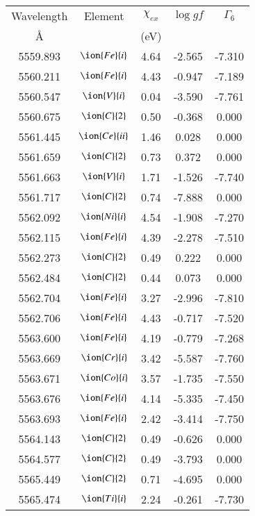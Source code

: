 \documentclass[fleqn,usenatbib]{mnras}
\begin{document}
\begin{center}
 \begin{table}
 \begin{tabular}{ccccc}
 \hline
 Wavelength & Element & $\chi_{ex}$ &  $\log gf$ & $\varGamma_{6}$ \\
   \AA{}    &         &  (eV)       &            &                  \\
 \hline
5559.893 &  $\ion{Fe}{i}$  & 4.64 & -2.565 & -7.310 \\ 
5560.211 &  $\ion{Fe}{i}$  & 4.43 & -0.947 & -7.189 \\ 
5560.547 &  $\ion{V}{i}$  & 0.04 & -3.590 & -7.761 \\ 
5560.675 &  $\ion{C}{2}$ & 0.50 & -0.368 & 0.000 \\ 
5561.445 &  $\ion{Ce}{ii}$  & 1.46 & 0.028 & 0.000 \\ 
5561.659 &  $\ion{C}{2}$ & 0.73 & 0.372 & 0.000 \\ 
5561.663 &  $\ion{V}{i}$  & 1.71 & -1.526 & -7.740 \\ 
5561.717 &  $\ion{C}{2}$ & 0.74 & -7.888 & 0.000 \\ 
5562.092 &  $\ion{Ni}{i}$  & 4.54 & -1.908 & -7.270 \\ 
5562.115 &  $\ion{Fe}{i}$  & 4.39 & -2.278 & -7.510 \\ 
5562.273 &  $\ion{C}{2}$ & 0.49 & 0.222 & 0.000 \\ 
5562.484 &  $\ion{C}{2}$ & 0.44 & 0.073 & 0.000 \\ 
5562.704 &  $\ion{Fe}{i}$  & 3.27 & -2.996 & -7.810 \\ 
5562.706 &  $\ion{Fe}{i}$  & 4.43 & -0.717 & -7.520 \\ 
5563.600 &  $\ion{Fe}{i}$  & 4.19 & -0.779 & -7.268 \\ 
5563.669 &  $\ion{Cr}{i}$  & 3.42 & -5.587 & -7.760 \\ 
5563.671 &  $\ion{Co}{i}$  & 3.57 & -1.735 & -7.550 \\ 
5563.676 &  $\ion{Fe}{i}$  & 4.14 & -5.335 & -7.450 \\ 
5563.693 &  $\ion{Fe}{i}$  & 2.42 & -3.414 & -7.750 \\ 
5564.143 &  $\ion{C}{2}$ & 0.49 & -0.626 & 0.000 \\ 
5564.577 &  $\ion{C}{2}$ & 0.49 & -3.793 & 0.000 \\ 
5565.449 &  $\ion{C}{2}$ & 0.71 & -4.695 & 0.000 \\ 
5565.474 &  $\ion{Ti}{i}$  & 2.24 & -0.261 & -7.730 \\ 

\end{tabular}
\end{table}
\end{center}
\end{document}
